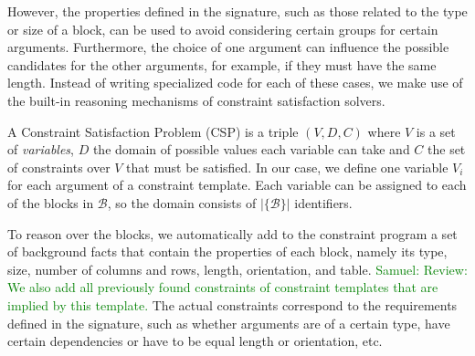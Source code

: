 \documentclass{IEEEtran}
\newcommand{\samuel}[1]{\textcolor{green}{{\sc Samuel:} #1}\xspace}
\newcommand{\tias}[1]{\textcolor{blue}{{\sc Tias:} #1}\xspace}
\newcommand{\format}[1]{\textit{#1}\xspace}
\newcommand{\template}{\format{constraint template}}
\newcommand{\CSignature}{Signature\xspace}
\newcommand{\groups}{\ensuremath{\mathcal{B}}\xspace}
\newcommand{\blocks}{\ensuremath{\mathcal{B}}\xspace}
\theoremstyle{definition}
\begin{document}
However, the properties defined in the signature, such as those related to the type or size of a block, can be used to avoid considering certain groups for certain arguments.
Furthermore, the choice of one argument can influence the possible candidates for the other arguments, for example, if they must have the same length.
Instead of writing specialized code for each of these cases, we make use of the built-in reasoning mechanisms of constraint satisfaction solvers.

A Constraint Satisfaction Problem (CSP) is a triple $(V,D,C)$ where $V$ is a set of \textit{variables}, $D$ the domain of possible values each variable can take and $C$ the set of constraints over $V$ that must be satisfied.
In our case, we define one variable $V_i$ for each argument of a constraint template.
Each variable can be assigned to each of the blocks in \blocks, so the domain consists of $|\{\blocks\}|$ identifiers.


To reason over the blocks, we automatically add to the constraint program a set of background facts that contain the properties of each block, namely its type, size, number of columns and rows, length, orientation, and table.
\samuel{Review: We also add all previously found constraints of constraint templates that are implied by this template.}
The actual constraints correspond to the requirements defined in the signature, such as whether arguments are of a certain type, have certain dependencies or have to be equal length or orientation, etc.

\end{document}
